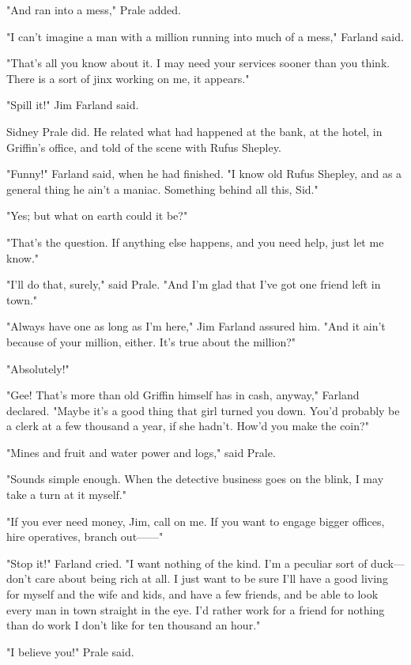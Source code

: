 \documentclass{novel}
\begin{document}
"And ran into a mess," Prale added.

"I can't imagine a man with a million running into much of a mess," Farland said.

"That's all you know about it. I may need your services sooner than you think. There is a sort of jinx working on me, it appears."

"Spill it!" Jim Farland said.

Sidney Prale did. He related what had happened at the bank, at the hotel, in Griffin's office, and told of the scene with Rufus Shepley.

"Funny!" Farland said, when he had finished. "I know old Rufus Shepley, and as a general thing he ain't a maniac. Something behind all this, Sid."

"Yes; but what on earth could it be?"

"That's the question. If anything else happens, and you need help, just let me know."

"I'll do that, surely," said Prale. "And I'm glad that I've got one friend left in town."

"Always have one as long as I'm here," Jim Farland assured him. "And it ain't because of your million, either. It's true about the million?"

"Absolutely!"

"Gee! That's more than old Griffin himself has in cash, anyway," Farland declared. "Maybe it's a good thing that girl turned you down. You'd probably be a clerk at a few thousand a year, if she hadn't. How'd you make the coin?"

"Mines and fruit and water power and logs," said Prale.

"Sounds simple enough. When the detective business goes on the blink, I may take a turn at it myself."

"If you ever need money, Jim, call on me. If you want to engage bigger offices, hire operatives, branch out------"

"Stop it!" Farland cried. "I want nothing of the kind. I'm a peculiar sort of duck---don't care about being rich at all. I just want to be sure I'll have a good living for myself and the wife and kids, and have a few friends, and be able to look every man in town straight in the eye. I'd rather work for a friend for nothing than do work I don't like for ten thousand an hour."

"I believe you!" Prale said.

\vspace{2\nbs}
\clearpage
\thispagestyle{empty}
\end{document}
